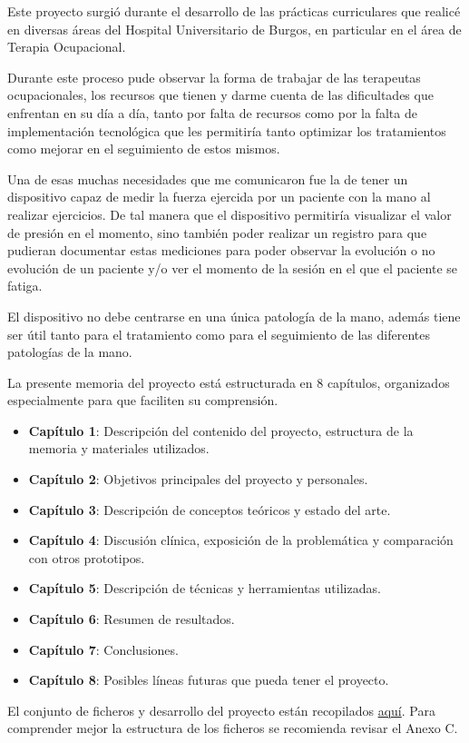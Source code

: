 Este proyecto surgió durante el desarrollo de las prácticas curriculares que realicé en diversas áreas del Hospital Universitario de Burgos, en particular en el área de Terapia Ocupacional. 

Durante este proceso pude observar la forma de trabajar de las terapeutas ocupacionales, los recursos que tienen y darme cuenta de las dificultades que enfrentan en su día a día, tanto por falta de recursos como por la falta de implementación tecnológica que les permitiría tanto optimizar los tratamientos como mejorar en el seguimiento de estos mismos.

Una de esas muchas necesidades que me comunicaron fue la de tener un dispositivo capaz de medir la fuerza ejercida por un paciente con la mano al realizar ejercicios. De tal manera que el dispositivo permitiría visualizar el valor de presión en el momento, sino también poder realizar un registro para que pudieran documentar estas mediciones para poder observar la evolución o no evolución de un paciente y/o ver el momento de la sesión en el que el paciente se fatiga.

El dispositivo no debe centrarse en una única patología de la mano, además tiene ser útil tanto para el tratamiento como para el seguimiento de las diferentes patologías de la mano.

La presente memoria del proyecto está estructurada en 8 capítulos, organizados especialmente para que faciliten su comprensión.
\begin{itemize}
    \item \textbf{Capítulo 1}: Descripción del contenido del proyecto, estructura de la memoria y materiales utilizados.
    \item \textbf{Capítulo 2}: Objetivos principales del proyecto y personales.
    \item \textbf{Capítulo 3}: Descripción de conceptos teóricos y estado del arte.
    \item \textbf{Capítulo 4}: Discusión clínica, exposición de la problemática y comparación con otros prototipos.
     \item \textbf{Capítulo 5}: Descripción de técnicas y herramientas utilizadas.
    \item \textbf{Capítulo 6}: Resumen de resultados.
    \item \textbf{Capítulo 7}: Conclusiones.
    \item \textbf{Capítulo 8}: Posibles líneas futuras que pueda tener el proyecto.
\end{itemize}
 
El conjunto de ficheros y desarrollo del proyecto están recopilados \href{https://github.com/cva1003/TFG}{aquí}. Para comprender mejor la estructura de los ficheros se recomienda revisar el Anexo C.